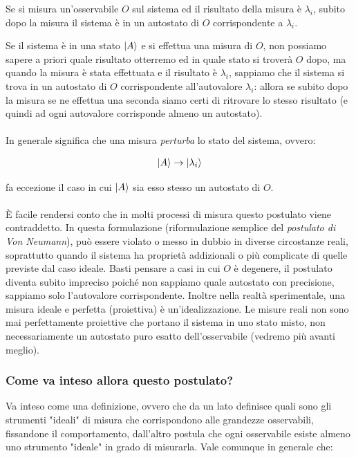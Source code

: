 \begin{mypost}
	Se si misura un'osservabile $O$ sul sistema ed il risultato della misura è $\lambda_i$, subito dopo la misura il sistema è in un autostato di $O$ corrispondente a $\lambda_i$. 
\end{mypost}
	
	Se il sistema è in una stato $\ket{A}$ e si effettua una misura di $O$, non possiamo sapere a priori quale risultato otterremo ed in quale stato si troverà $O$ dopo, ma quando la misura è stata effettuata e il risultato è $\lambda_i$, sappiamo che il sistema si trova in un autostato di $O$ corrispondente all'autovalore $\lambda_i$: allora se subito dopo la misura se ne effettua una seconda siamo certi di ritrovare lo stesso risultato (e quindi ad ogni autovalore corrisponde almeno un autostato).
	\\
	\\
	In generale significa che una  misura \textit{perturba} lo stato del sistema, ovvero:
	
\begin{align*}
	\ket{A} \to \ket{\lambda_i}
\end{align*}
	
	fa eccezione il caso in cui $\ket{A}$ sia esso stesso un autostato di $O$.
	\\
	\\
	 È facile rendersi conto che in molti processi di misura questo postulato viene contraddetto. In questa formulazione (riformulazione semplice del \textit{postulato di Von Neumann}), può essere violato o messo in dubbio in diverse circostanze reali, soprattutto quando il sistema ha proprietà addizionali o più complicate di quelle previste dal caso ideale. Basti pensare a casi in cui $O$ è degenere, il postulato diventa subito impreciso poiché non sappiamo quale autostato con precisione, sappiamo solo l'autovalore corrispondente. Inoltre nella realtà sperimentale, una misura ideale e perfetta (proiettiva) è un'idealizzazione. Le misure reali non sono mai perfettamente proiettive che portano il sistema in uno stato misto, non necessariamente un autostato puro esatto dell'osservabile (vedremo più avanti meglio).
	 
\subsubsection{Come va inteso allora questo postulato?}

	Va inteso come una definizione, ovvero che da un lato definisce quali sono gli strumenti "ideali" di misura che corrispondono alle grandezze osservabili, fissandone il comportamento, dall'altro postula che ogni osservabile esiste almeno uno strumento "ideale" in grado di misurarla. Vale comunque in generale che:
	
